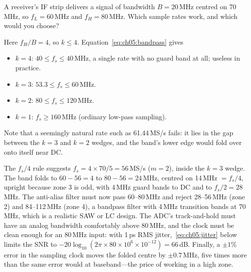 \begin{worked}
A receiver's IF strip delivers a signal of bandwidth $B=20$\,MHz centred on 70\,MHz, so
$f_L=60$\,MHz and $f_H=80$\,MHz. Which sample rates work, and which would you choose?

Here $f_H/B=4$, so $k\le4$. Equation~\eqref{eq:ch05:bandpass} gives
\begin{itemize}
\item $k=4$: $40\le f_s\le40$\,MHz, a single rate with no guard band at all; useless in practice.
\item $k=3$: $53.3\le f_s\le60$\,MHz.
\item $k=2$: $80\le f_s\le120$\,MHz.
\item $k=1$: $f_s\ge160$\,MHz (ordinary low-pass sampling).
\end{itemize}
Note that a seemingly natural rate such as 61.44\,MS/s fails: it lies in the gap between the
$k=3$ and $k=2$ wedges, and the band's lower edge would fold over onto itself near DC.

The $f_s/4$ rule suggests $f_s=4\times70/5=56$\,MS/s ($m=2$), inside the $k=3$ wedge. The band
folds to $60-56=4$ to $80-56=24$\,MHz, centred on 14\,MHz $=f_s/4$, upright because zone 3 is
odd, with 4\,MHz guard bands to DC and to $f_s/2=28$\,MHz. The anti-alias filter must
now pass 60--80\,MHz and reject 28--56\,MHz (zone 2) and 84--112\,MHz (zone 4), a bandpass filter
with 4\,MHz transition bands at 70\,MHz, which is a realistic SAW or LC design. The ADC's
track-and-hold must have an analog bandwidth comfortably above 80\,MHz, and the clock must be
clean enough for an 80\,MHz input: with 1\,ps RMS jitter,~\eqref{eq:ch05:jitter} below limits the
SNR to $-20\log_{10}(2\pi\times80\times10^6\times10^{-12})=66$\,dB. Finally, a $\pm1$\% error in
the sampling clock moves the folded centre by $\pm0.7$\,MHz, five times more than the same
error would at baseband---the price of working in a high zone.
\end{worked}


